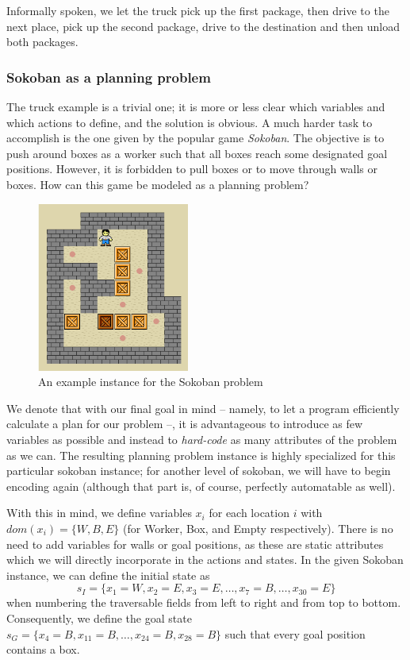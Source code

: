 \documentclass{article}
\theoremstyle{definition}
\begin{document}
Informally spoken, we let the truck pick up the first package, then drive to the next place, pick up the second package, drive to the destination and then unload both packages.

\subsubsection{Sokoban as a planning problem}

The truck example is a trivial one; it is more or less clear which variables and which actions to define, and the solution is obvious. A much harder task to accomplish is the one given by the popular game \emph{Sokoban}. The objective is to push around boxes as a worker such that all boxes reach some designated goal positions. However, it is forbidden to pull boxes or to move through walls or boxes. How can this game be modeled as a planning problem?

\begin{figure}[h]
\begin{center}
\includegraphics[width=5cm]{sokoban.png}
\caption{An example instance for the Sokoban problem}
\end{center}
\end{figure}

We denote that with our final goal in mind -- namely, to let a program efficiently calculate a plan for our problem --, it is advantageous to introduce as few variables as possible and instead to \emph{hard-code} as many attributes of the problem as we can. The resulting planning problem instance is highly specialized for this particular sokoban instance; for another level of sokoban, we will have to begin encoding again (although that part is, of course, perfectly automatable as well).

With this in mind, we define variables $x_i$ for each location $i$ with $\textit{dom}(x_i) = \{W, B, E\}$ (for Worker, Box, and Empty respectively). There is no need to add variables for walls or goal positions, as these are static attributes which we will directly incorporate in the actions and states. In the given Sokoban instance, we can define the initial state as \[s_I = \{x_1 = W, x_2 = E, x_3 = E, \ldots, x_7 = B, \ldots, x_{30} = E\}\] when numbering the traversable fields from left to right and from top to bottom. Consequently, we define the goal state $s_G = \{x_4 = B, x_{11} = B, \ldots, x_{24} = B, x_{28} = B\}$ such that every goal position contains a box.
\end{document}
